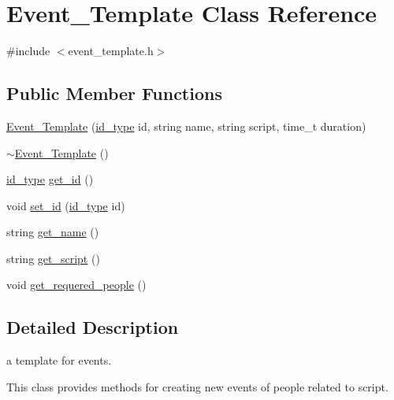 \hypertarget{classEvent__Template}{
\section{Event\_\-Template Class Reference}
\label{df/d6e/classEvent__Template}
}


{\ttfamily \#include $<$event\_\-template.h$>$}

\subsection*{Public Member Functions}
\begin{DoxyCompactItemize}
\item 
\hyperlink{classEvent__Template_a9b9d2cac8e055691f223f4f3bd045f67}{Event\_\-Template} (\hyperlink{types_8h_a0b60c08a3ab1435cccc5643d32d8ccee}{id\_\-type} id, string name, string script, time\_\-t duration)
\item 
\hyperlink{classEvent__Template_a67a470b75e148a9ecc3ecdb941d77b44}{$\sim$Event\_\-Template} ()
\item 
\hyperlink{types_8h_a0b60c08a3ab1435cccc5643d32d8ccee}{id\_\-type} \hyperlink{classEvent__Template_a8e5659c7e0d4e1fc373d6f89c4d7f8b5}{get\_\-id} ()
\item 
void \hyperlink{classEvent__Template_a3258c27adfe3f48d1b2d9c17fdc221d1}{set\_\-id} (\hyperlink{types_8h_a0b60c08a3ab1435cccc5643d32d8ccee}{id\_\-type} id)
\item 
string \hyperlink{classEvent__Template_a80afa18429deb22d7480404c2d699f8a}{get\_\-name} ()
\item 
string \hyperlink{classEvent__Template_ac3952dcb999cfce3b5455b9e1aff21a7}{get\_\-script} ()
\item 
void \hyperlink{classEvent__Template_af573da4a03fb22083d935097951c39cb}{get\_\-requered\_\-people} ()
\end{DoxyCompactItemize}


\subsection{Detailed Description}
a template for events.

This class provides methods for creating new events of people related to script. 

